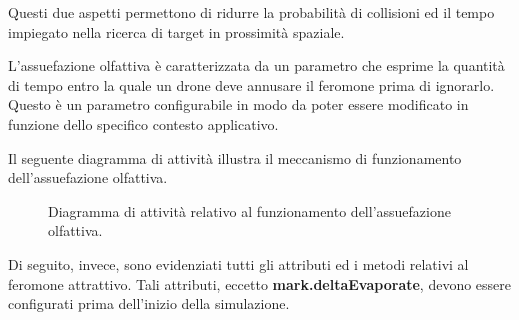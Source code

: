 Questi due aspetti permettono di ridurre la probabilità di collisioni ed il tempo impiegato nella ricerca di target in prossimità spaziale. 

L’assuefazione olfattiva è caratterizzata da un parametro che esprime la quantità di tempo entro la quale un drone deve annusare il feromone prima di ignorarlo. 
Questo è un parametro configurabile in modo da poter essere modificato in funzione dello specifico contesto applicativo. 

Il seguente diagramma di attività illustra il meccanismo di funzionamento dell’assuefazione olfattiva.

\begin{figure}[H] 
    \captionsetup{justification=centering, margin=2cm, font=footnotesize}
    \begin{center}
    \end{center}
    \caption{Diagramma di attività relativo al funzionamento dell'assuefazione olfattiva.}
    \label{activity_assuefazione}
\end{figure}

Di seguito, invece, sono evidenziati tutti gli attributi ed i metodi relativi al feromone attrattivo.
Tali attributi, eccetto \textbf{mark.deltaEvaporate}, devono essere configurati prima dell'inizio della simulazione.

